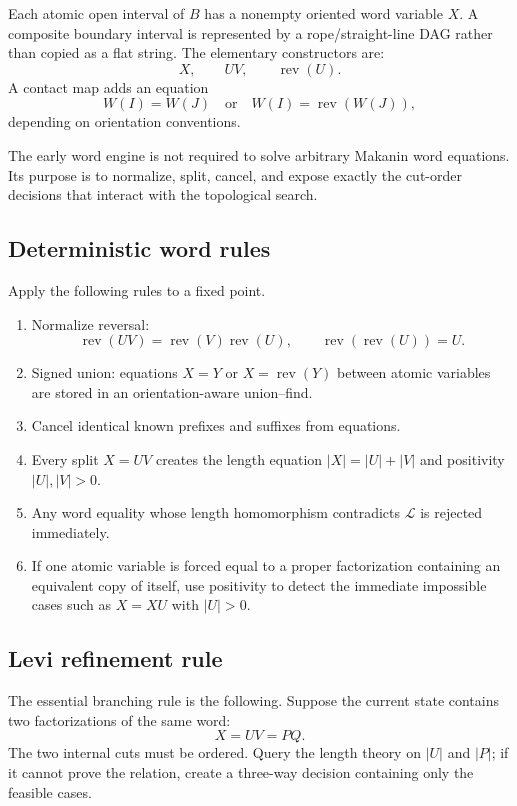 \documentclass[11pt]{article}
\begin{document}
Each atomic open interval of $B$ has a nonempty oriented word variable $X$.  A composite boundary interval is represented by a rope/straight-line DAG rather than copied as a flat string.  The elementary constructors are:
\[
  X,\qquad UV,\qquad \operatorname{rev}(U).
\]
A contact map adds an equation
\[
  W(I)=W(J)\quad\text{or}\quad W(I)=\operatorname{rev}(W(J)),
\]
depending on orientation conventions.

The early word engine is not required to solve arbitrary Makanin word equations.  Its purpose is to normalize, split, cancel, and expose exactly the cut-order decisions that interact with the topological search.

\subsection{Deterministic word rules}

Apply the following rules to a fixed point.
\begin{enumerate}[label=(W\arabic*)]
  \item Normalize reversal:
  \[
    \operatorname{rev}(UV)=\operatorname{rev}(V)\operatorname{rev}(U),
    \qquad \operatorname{rev}(\operatorname{rev}(U))=U.
  \]
  \item Signed union: equations $X=Y$ or $X=\operatorname{rev}(Y)$ between atomic variables are stored in an orientation-aware union--find.
  \item Cancel identical known prefixes and suffixes from equations.
  \item Every split $X=UV$ creates the length equation $|X|=|U|+|V|$ and positivity $|U|,|V|>0$.
  \item Any word equality whose length homomorphism contradicts $\mathcal L$ is rejected immediately.
  \item If one atomic variable is forced equal to a proper factorization containing an equivalent copy of itself, use positivity to detect the immediate impossible cases such as $X=XU$ with $|U|>0$.
\end{enumerate}

\subsection{Levi refinement rule}

The essential branching rule is the following.  Suppose the current state contains two factorizations of the same word:
\[
  X=UV=PQ.
\]
The two internal cuts must be ordered.  Query the length theory on $|U|$ and $|P|$; if it cannot prove the relation, create a three-way decision containing only the feasible cases.
\end{document}
